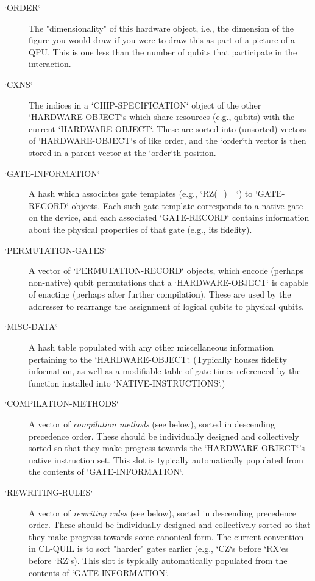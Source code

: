 \begin{description}
	\item[`ORDER`] The "dimensionality" of this hardware object, i.e., the dimension of the figure you would draw if you were to draw this as part of a picture of a QPU.  This is one less than the number of qubits that participate in the interaction.
	\item[`CXNS`] The indices in a `CHIP-SPECIFICATION` object of the other `HARDWARE-OBJECT`s which share resources (e.g., qubits) with the current `HARDWARE-OBJECT`.  These are sorted into (unsorted) vectors of `HARDWARE-OBJECT`s of like order, and the `order`th vector is then stored in a parent vector at the `order`th position.
	\item [`GATE-INFORMATION`] A hash which associates gate templates (e.g., `RZ(_) _`) to `GATE-RECORD` objects.  Each such gate template corresponds to a native gate on the device, and each associated `GATE-RECORD` contains information about the physical properties of that gate (e.g., its fidelity).
	\item[`PERMUTATION-GATES`] A vector of `PERMUTATION-RECORD` objects, which encode (perhaps non-native) qubit permutations that a `HARDWARE-OBJECT` is capable of enacting (perhaps after further compilation).  These are used by the addresser to rearrange the assignment of logical qubits to physical qubits.
	\item[`MISC-DATA`] A hash table populated with any other miscellaneous information pertaining to the `HARDWARE-OBJECT`.  (Typically houses fidelity information, as well as a modifiable table of gate times referenced by the function installed into `NATIVE-INSTRUCTIONS`.)
        \item[`COMPILATION-METHODS`] A vector of \textit{compilation methods} (see below), sorted in descending precedence order.  These should be individually designed and collectively sorted so that they make progress towards the `HARDWARE-OBJECT`'s native instruction set.  This slot is typically automatically populated from the contents of `GATE-INFORMATION`.
        \item[`REWRITING-RULES`] A vector of \textit{rewriting rules} (see below), sorted in descending precedence order.  These should be individually designed and collectively sorted so that they make progress towards some canonical form.  The current convention in CL-QUIL is to sort "harder" gates earlier (e.g., `CZ`s before `RX`es before `RZ`s).  This slot is typically automatically populated from the contents of `GATE-INFORMATION`.
\end{description}

